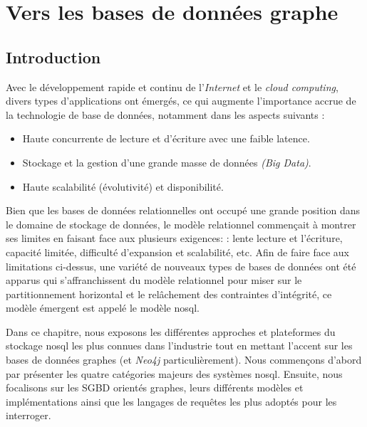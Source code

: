 \chapter{Vers les bases de données graphe}
\label{ch:graph-db}

\section*{Introduction}
 

Avec le développement rapide et continu de l'\textit{Internet} et le
\textit{cloud computing}, divers types d'applications ont émergés, ce
qui augmente l'importance accrue de la technologie de base de données,
notamment dans les aspects suivants \cite{han2011survey}:

\begin{itemize}\renewcommand\labelitemi{--}
\item Haute concurrente de lecture et d'écriture avec une faible
  latence.

\item Stockage et la gestion d'une grande masse de données \emph{(Big
    Data)}.

\item Haute scalabilité (évolutivité) et disponibilité.\medskip
\end{itemize}
\enddescription

Bien que les bases de données relationnelles ont occupé une grande
position dans le domaine de stockage de données, le modèle relationnel
commençait à montrer ses limites en faisant face aux plusieurs
exigences: \cite{han2011survey}: lente lecture et l'écriture, capacité
limitée, difficulté d'expansion et scalabilité, etc. Afin de faire
face aux limitations ci-dessus, une variété de nouveaux types de bases
de données ont été apparus qui s'affranchissent du modèle relationnel
pour miser sur le partitionnement horizontal et le relâchement des
contraintes d'intégrité, ce modèle émergent est appelé le modèle
\acrshort{nosql}.\medskip

Dans ce chapitre, nous exposons les différentes approches et
plateformes du stockage \acrshort{nosql} les plus connues dans
l'industrie tout en mettant l'accent sur les bases de données graphes
(et \emph{Neo4j} particulièrement). Nous commençons d'abord par
présenter les quatre catégories majeurs des systèmes
\acrshort{nosql}. Ensuite, nous focalisons sur les \acrshort{SGBD}
orientés graphes, leurs différents modèles et implémentations ainsi
que les langages de requêtes les plus adoptés pour les interroger.

